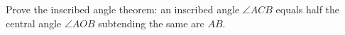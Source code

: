 Prove the inscribed angle theorem: an inscribed angle $\angle ACB$ equals half the central angle $\angle AOB$ subtending the same arc $AB$.
